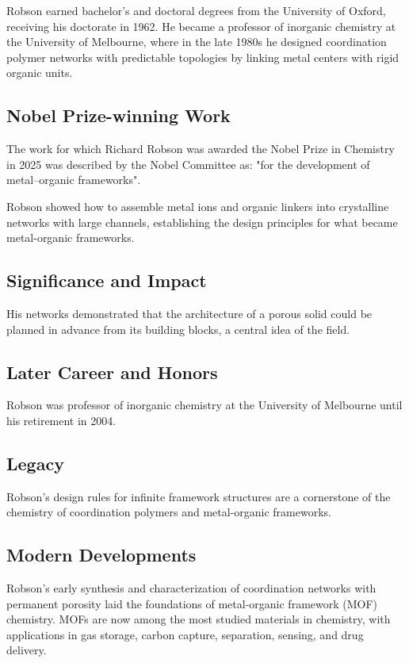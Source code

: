 Robson earned bachelor's and doctoral degrees from the University of Oxford, receiving his doctorate in 1962. He became a professor of inorganic chemistry at the University of Melbourne, where in the late 1980s he designed coordination polymer networks with predictable topologies by linking metal centers with rigid organic units.

\subsection*{Nobel Prize-winning Work}

The work for which Richard Robson was awarded the Nobel Prize in Chemistry in 2025 was described by the Nobel Committee as: "for the development of metal–organic frameworks".

Robson showed how to assemble metal ions and organic linkers into crystalline networks with large channels, establishing the design principles for what became metal-organic frameworks.

\subsection*{Significance and Impact}

His networks demonstrated that the architecture of a porous solid could be planned in advance from its building blocks, a central idea of the field.

\subsection*{Later Career and Honors}

Robson was professor of inorganic chemistry at the University of Melbourne until his retirement in 2004.

\subsection*{Legacy}

Robson's design rules for infinite framework structures are a cornerstone of the chemistry of coordination polymers and metal-organic frameworks.

\subsection*{Modern Developments}

Robson's early synthesis and characterization of coordination networks with permanent porosity laid the foundations of metal-organic framework (MOF) chemistry. MOFs are now among the most studied materials in chemistry, with applications in gas storage, carbon capture, separation, sensing, and drug delivery.

